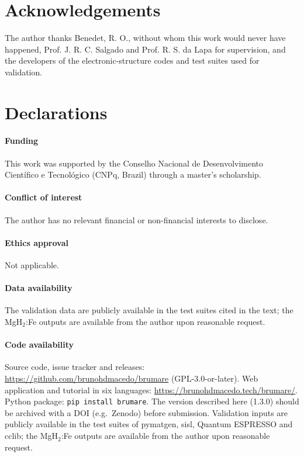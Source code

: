 \documentclass[11pt,a4paper]{article}
\begin{document}
\section*{Acknowledgements}
The author thanks Benedet, R. O., without whom this work would never have happened, Prof. J. R. C. Salgado and Prof. R. S. da Lapa for supervision, and the developers of the electronic-structure codes and test suites used for validation.
\section*{Declarations}
\paragraph{Funding} This work was supported by the Conselho Nacional de Desenvolvimento Cient\'ifico e Tecnol\'ogico (CNPq, Brazil) through a master's scholarship.
\paragraph{Conflict of interest} The author has no relevant financial or non-financial interests to disclose.
\paragraph{Ethics approval} Not applicable.
\paragraph{Data availability} The validation data are publicly available in the test suites cited in the text; the MgH$_2$:Fe outputs are available from the author upon reasonable request.
\paragraph{Code availability} Source code, issue tracker and releases: \url{https://github.com/brunohdmacedo/brumare} (GPL-3.0-or-later). Web application and tutorial in six languages: \url{https://brunohdmacedo.tech/brumare/}. Python package: \texttt{pip install brumare}. The version described here (1.3.0) should be archived with a DOI (e.g.\ Zenodo) before submission. Validation inputs are publicly available in the test suites of pymatgen, sisl, Quantum ESPRESSO and cclib; the MgH$_2$:Fe outputs are available from the author upon reasonable request.
\end{document}
